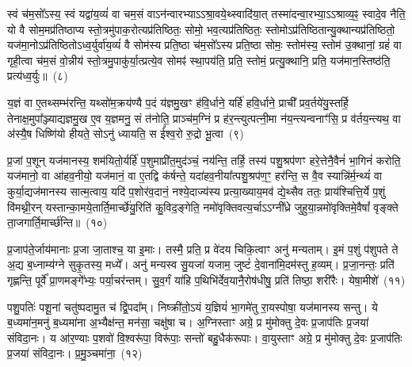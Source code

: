 स्वं च॑म॒सो᳚\-ऽस्य॒ स्वं यद्वा॑य॒व्यं॑ वा चम॒सं वा\-ऽन॑न्वारभ्या\-ऽऽ\-श्रा॒वये॒थ्\-स्वादि॑या॒त् तस्मा॑दन्वा॒रभ्या॒\-ऽऽ\-श्राव्य॒ꣴ॒ स्वादे॒व नैति॒ यो वै सोम॒मप्र॑तिष्ठाप्य स्तो॒त्रमु॑पाक॒रोत्यप्र॑तिष्ठितः॒ सोमो॒ भव॒त्यप्र॑तिष्ठितः॒ स्तोमो\-ऽप्र॑तिष्ठितान्यु॒क्थान्यप्र॑तिष्ठितो॒ यज॑मा॒नो\-ऽप्र॑तिष्ठितो\-ऽध्व॒र्युर्वा॑य॒व्यं॑ वै सोम॑स्य प्रति॒ष्ठा च॑म॒सो᳚\-ऽस्य प्रति॒ष्ठा सोमः॒ स्तोम॑स्य॒ स्तोम॑ उ॒क्थानां॒ ग्रहं॑ वा गृही॒त्वा च॑म॒सं वो॒न्नीय॑ स्तो॒त्रमु॒पाकु॑र्या॒त्प्रत्ये॒व सोमꣴ॑ स्था॒पय॑ति॒ प्रति॒ स्तोमं॒ प्रत्यु॒क्थानि॒ प्रति॒ यज॑मान॒स्तिष्ठ॑ति॒ प्रत्य॑ध्व॒र्युः॥~(८)

{\anuvakamend[{ए॒व ति॑ष्ठति॒ यो वा॑य॒व्य॑मस्य॒ ग्रहं॒ वैका॒न्नविꣳ॑श॒तिश्च॑}]}%

य॒ज्ञं वा ए॒तथ्सम्भ॑रन्ति॒ यथ्सो॑म॒क्रय॑ण्यै प॒दं य॑ज्ञमु॒खꣳ ह॑वि॒र्धाने॒ यर्\mbox{}हि॑ हवि॒र्धाने॒ प्राची᳚ प्रव॒र्तये॑यु॒स्तर्\mbox{}हि॒ तेनाक्ष॒मुपा᳚ञ्ज्याद्यज्ञ\-मु॒ख ए॒व य॒ज्ञमनु॒ सं त॑नोति॒ प्राञ्च॑म॒ग्निं प्र ह॑र॒न्त्युत्पत्नी॒मा न॑य॒न्त्यन्वनाꣳ॑सि॒ प्र व॑र्तय॒न्त्यथ॒ वा अ॑स्यै॒ष धिष्णि॑यो हीयते॒ सो\-ऽनु॑ ध्यायति॒ स ई᳚श्व॒रो रु॒द्रो भू॒त्वा~(९)

प्र॒जां प॒शून् यज॑मानस्य॒ शम॑यितो॒र्यर्\mbox{}हि॑ प॒शुमाप्री॑त॒मुद॑ञ्चं॒ नय॑न्ति॒ तर्\mbox{}हि॒ तस्य॑ पशु॒श्रप॑णꣳ हरे॒त्तेनै॒वैनं॑ भा॒गिनं॑ करोति॒ यज॑मानो॒ वा आ॑हव॒नीयो॒ यज॑मानं॒ वा ए॒तद्वि क॑र्\mbox{}षन्ते॒ यदा॑हव॒नीया᳚त्पशु॒श्रप॑ण॒ꣳ॒ हर॑न्ति॒ स वै॒व स्यान्नि॑र्म॒न्थ्यं॑ वा कुर्या॒द्यज॑मानस्य सात्म॒त्वाय॒ यदि॑ प॒शोर॑व॒दानं॒ नश्ये॒दाज्य॑स्य प्रत्या॒ख्याय॒मव॑ द्ये॒थ्सैव ततः॒ प्राय॑श्चित्ति॒र्ये प॒शुं वि॑मथ्नी॒रन् यस्तान्का॒मये॒तार्ति॒मार्च्छे॑यु॒रिति॑ कु॒विद॒ङ्गेति॒ नमो॑वृक्तिवत्य॒र्चा\-ऽऽ\-ग्नी᳚ध्रे जुहुया॒न्नमो॑वृक्तिमे॒वैषां᳚ वृङ्क्ते ता॒जगार्ति॒मार्च्छ॑न्ति॥~(१०)

{\anuvakamend[{भू॒त्वा ततः॒ षड्विꣳ॑शतिश्च}]}%

प्र॒जा\-प॑ते॒र्जाय॑मानाः प्र॒जा जा॒ताश्च॒ या इ॒माः। तस्मै॒ प्रति॒ प्र वे॑दय चिकि॒त्वाꣳ अनु॑ मन्यताम्। इ॒मं प॒शुं प॑शुपते ते अ॒द्य ब॒ध्नाम्य॑ग्ने सुकृ॒तस्य॒ मध्ये᳚। अनु॑ मन्यस्व सु॒यजा॑ यजाम॒ जुष्टं॑ दे॒वाना॑मि॒दम॑स्तु ह॒व्यम्। प्र॒जा॒नन्तः॒ प्रति॑ गृह्णन्ति॒ पूर्वे᳚ प्रा॒णमङ्गे᳚भ्यः॒ पर्या॒चर॑न्तम्। सु॒व॒र्गं या॑हि प॒थिभि॑र्देव॒यानै॒रोष॑धीषु॒ प्रति॑ तिष्ठा॒ शरी॑रैः। येषा॒मीशे॑~(११)

पशु॒पतिः॑ पशू॒नां चतु॑ष्पदामु॒त च॑ द्वि॒पदा᳚म्। निष्क्री॑तो॒\-ऽयं य॒ज्ञियं॑ भा॒गमे॑तु रा॒यस्पोषा॒ यज॑मानस्य सन्तु। ये ब॒ध्यमा॑न॒मनु॑ ब॒ध्यमा॑ना अ॒भ्यैक्ष॑न्त॒ मन॑सा॒ चक्षु॑षा च। अ॒ग्निस्ताꣳ अग्रे॒ प्र मु॑मोक्तु दे॒वः प्र॒जा\-प॑तिः प्र॒जया॑ संविदा॒नः। य आ॑र॒ण्याः प॒शवो॑ वि॒श्वरू॑पा॒ विरू॑पाः॒ सन्तो॑ बहु॒धैक॑रूपाः। वा॒युस्ताꣳ अग्रे॒ प्र मु॑मोक्तु दे॒वः प्र॒जा\-प॑तिः प्र॒जया॑ संविदा॒नः। प्र॒मु॒ञ्चमा॑ना॒~(१२)

